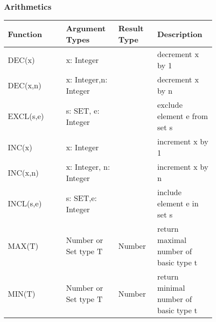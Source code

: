 \documentclass[a4wide,11pt]{article}
\begin{document}
\subsubsection{Arithmetics}
\begin{longtable}{|p{0.25\linewidth}|p{0.2\linewidth}|p{0.15\linewidth}|p{0.25\linewidth}|}
\hline
Function & Argument Types & Result Type & Description \\
\hline\hline
\endhead
DEC(x) & x: Integer &  & decrement x by 1 \\
DEC(x,n) & x: Integer,\newline n: Integer &  & decrement x by n \\
EXCL(s,e) & s: SET, e: Integer & & exclude element e from set s \\
INC(x) & x: Integer &  & increment x by 1 \\
INC(x,n) & x: Integer, \newline n: Integer &  & increment x by n \\
INCL(s,e) & s: SET,\newline  e: Integer & & include element e in set s \\
MAX(T) & Number or Set type T & Number & return maximal number of basic type t\\
MIN(T) & Number or Set type T & Number & return minimal number of basic type t\\
\hline
\end{longtable}
\end{document}
